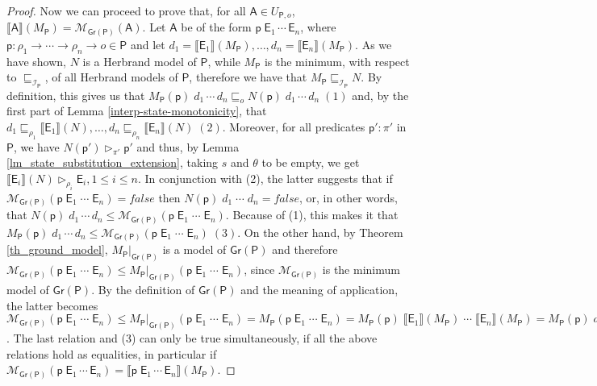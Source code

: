 \documentclass[submission,copyright]{eptcs}
\theoremstyle{definition}
\newcommand{\mwrt}[2]{\llbracket#1\rrbracket(#2)}
\newcommand{\aleq}[1][]{\sqsubseteq_{#1}}
\newcommand{\ee}[1][I]{\rhd_{#1}}
\newcommand{\bezem}{\mathcal{M}_\mathsf{Gr(P)}}
\begin{document}
\begin{proof}
Now we can proceed to prove that, for all $\mathsf{A} \in U_{\mathsf{P},o}$, $\mwrt{\mathsf{A}}{M_\mathsf{P}} = \bezem(\mathsf{A})$.
Let $\mathsf{A}$ be of the form $\mathsf{p} \; \mathsf{E}_1 \, \cdots \, \mathsf{E}_n$, where
$\mathsf{p} : \rho_1 \rightarrow \cdots \rightarrow \rho_n \rightarrow o \in \mathsf{P}$ and let
$d_1 = \mwrt{\mathsf{E}_1}{M_\mathsf{P}}, \ldots, d_n = \mwrt{\mathsf{E}_n}{M_\mathsf{P}}$. As we have shown,
$N$ is a Herbrand model of $\mathsf{P}$, while $M_\mathsf{P}$ is the minimum, with respect to $\aleq[\mathcal{I}_\mathsf{P}]$, of all Herbrand models of $\mathsf{P}$,
therefore we have that $M_\mathsf{P} \aleq[\mathcal{I}_\mathsf{P}] N$. By definition, this gives us that
$M_\mathsf{P}(\mathsf{p})\; d_1 \, \cdots \, d_n \aleq[o] N(\mathsf{p}) \; d_1 \, \cdots \, d_n \; (1)$ and,
by the first part of Lemma \ref{interp-state-monotonicity}, that
$d_1 \aleq[\rho_1] \mwrt{\mathsf{E}_1}{N}, \ldots, d_n \aleq[\rho_n] \mwrt{\mathsf{E}_n}{N} \;(2)$.
Moreover, for all predicates $\mathsf{p}':\pi'$ in $\mathsf{P}$, we have $N(\mathsf{p}') \ee[\pi'] \mathsf{p}'$ and thus,
by Lemma \ref{lm_state_substitution_extension}, taking $s$ and $\theta$ to be empty,
we get $\mwrt{\mathsf{E}_i}{N} \ee[\rho_i] \mathsf{E}_i, 1\leq i\leq n$. In conjunction with (2), the latter suggests
that if $\bezem(\mathsf{p} \; \mathsf{E}_1 \; \cdots \; \mathsf{E}_n) = \mathit{false}$ then $N(\mathsf{p}) \; d_1 \; \cdots \; d_n = \mathit{false}$,
or, in other words, that $ N(\mathsf{p}) \; d_1 \, \cdots \, d_n \leq \bezem(\mathsf{p} \; \mathsf{E}_1 \; \cdots \; \mathsf{E}_n)$.
Because of (1), this makes it that
$ M_\mathsf{P}(\mathsf{p}) \; d_1 \, \cdots \, d_n \leq \bezem(\mathsf{p} \; \mathsf{E}_1 \; \cdots \; \mathsf{E}_n)\;(3)$. On the
other hand, by Theorem \ref{th_ground_model}, $M_\mathsf{P}|_\mathsf{Gr(P)}$ is a model of $\mathsf{Gr(P)}$ and therefore $\bezem(\mathsf{p} \; \mathsf{E}_1 \; \cdots \; \mathsf{E}_n) \leq M_\mathsf{P}|_\mathsf{Gr(P)}(\mathsf{p} \; \mathsf{E}_1 \; \cdots \; \mathsf{E}_n)$, since $\bezem$ is the minimum model of $\mathsf{Gr(P)}$. By the definition of $\mathsf{Gr(P)}$ and the meaning of application, the latter becomes
$\bezem(\mathsf{p} \; \mathsf{E}_1 \; \cdots \; \mathsf{E}_n) \leq M_\mathsf{P}|_\mathsf{Gr(P)}(\mathsf{p} \; \mathsf{E}_1 \; \cdots \; \mathsf{E}_n)=M_\mathsf{P}(\mathsf{p} \; \mathsf{E}_1 \; \cdots \; \mathsf{E}_n) = M_\mathsf{P}(\mathsf{p})\; \mwrt{\mathsf{E}_1}{M_\mathsf{P}}\; \cdots \; \mwrt{\mathsf{E}_n}{M_\mathsf{P}} = M_\mathsf{P}(\mathsf{p})\; d_1 \, \cdots \, d_n$. The last relation and (3) can only be true simultaneously, if all the above relations hold as equalities, in particular if $\bezem(\mathsf{p} \; \mathsf{E}_1 \, \cdots \, \mathsf{E}_n) = \mwrt{\mathsf{p} \; \mathsf{E}_1 \, \cdots \, \mathsf{E}_n}{M_\mathsf{P}}$.
\end{proof}
\end{document}
